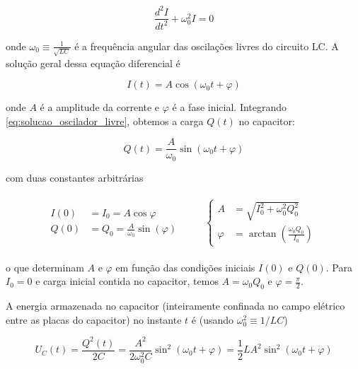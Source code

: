 \documentclass[12pt]{article}
\begin{document}
\begin{equation}
    \frac{d^2I}{dt^2} + \omega_0^2 I = 0
\end{equation}

\noindent onde \(\displaystyle \omega_0 \equiv \frac{1}{\sqrt{LC}}\) é a frequência angular das oscilações livres do circuito LC. A solução geral dessa equação diferencial é

\begin{equation}\label{eq:solucao_oscilador_livre}
    \boxed{I(t) = A \cos(\omega_0 t + \varphi)}
\end{equation}

\noindent onde \(A\) é a amplitude da corrente e \(\varphi\) é a fase inicial. Integrando \eqref{eq:solucao_oscilador_livre}, obtemos a carga \(Q(t)\) no capacitor:

\begin{equation}
    \boxed{Q(t) = \frac{A}{\omega_0} \sin(\omega_0 t + \varphi)}
\end{equation}

\noindent com duas constantes arbitrárias

\begin{align}
    \begin{aligned}
        I(0) &= I_0 = A \cos \varphi \\
        Q(0) &= Q_0 = \frac{A}{\omega_0} \sin(\varphi)
        \end{aligned}
    \qquad
    \begin{aligned}\begin{cases}
        A &= \sqrt{I_0^2 + \omega_0^2 Q_0^2} \\
        \varphi &= \arctan \left( \frac{\omega_0 Q_0}{I_0} \right)
    \end{cases}\end{aligned}
\end{align}

\noindent o que determinam \(A\) e \(\varphi\) em função das condições iniciais \(I(0)\) e \(Q(0)\). Para \(I_0 = 0\) e carga inicial contida no capacitor, temos \(A = \omega_0 Q_0\) e \(\varphi = \frac{\pi}{2}\).

A energia armazenada no capacitor (inteiramente confinada no campo elétrico entre as placas do capacitor) no instante \(t\) é (usando \(\omega_0^2 \equiv 1/LC\))

\begin{equation}
    \boxed{U_C(t) = \frac{Q^2(t)}{2C} = \frac{A^2}{2\omega_0^2 C} \sin^2(\omega_0 t + \varphi) = \frac{1}{2}LA^2 \sin^2(\omega_0 t + \varphi)}
\end{equation}
\end{document}
